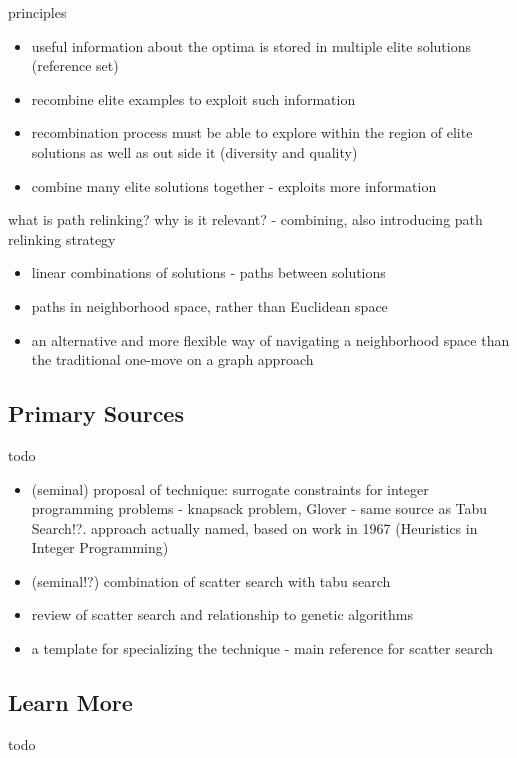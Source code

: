 \documentclass[a4paper, 11pt]{article}
\begin{document}
principles
\begin{itemize}
	\item useful information about the optima is stored in multiple elite solutions (reference set)
	\item recombine elite examples to exploit such information
	\item recombination process must be able to explore within the region of elite solutions as well as out side it (diversity and quality)
	\item combine many elite solutions together - exploits more information
\end{itemize}

what is path relinking? why is it relevant? \cite{Glover1994a} - combining, also introducing path relinking strategy
\begin{itemize}
	\item linear combinations of solutions - paths between solutions
	\item paths in neighborhood space, rather than Euclidean space
	\item an alternative and more flexible way of navigating a neighborhood space than the traditional one-move on a graph approach
	
\end{itemize}


% 
% 
\subsection{Primary Sources}
todo

\begin{itemize}
	\item (seminal) proposal of technique: surrogate constraints for integer programming problems - knapsack problem, Glover \cite{Glover1977} - same source as Tabu Search!?. approach actually named, based on work in 1967 (Heuristics in Integer Programming)
	\item (seminal!?) combination of scatter search with tabu search \cite{Glover1994a}
	\item review of scatter search and relationship to genetic algorithms \cite{Glover1994}
	\item a template for specializing the technique \cite{Glover1998a} - main reference for scatter search
\end{itemize}

% 
% 
\subsection{Learn More}
todo
\end{document}
